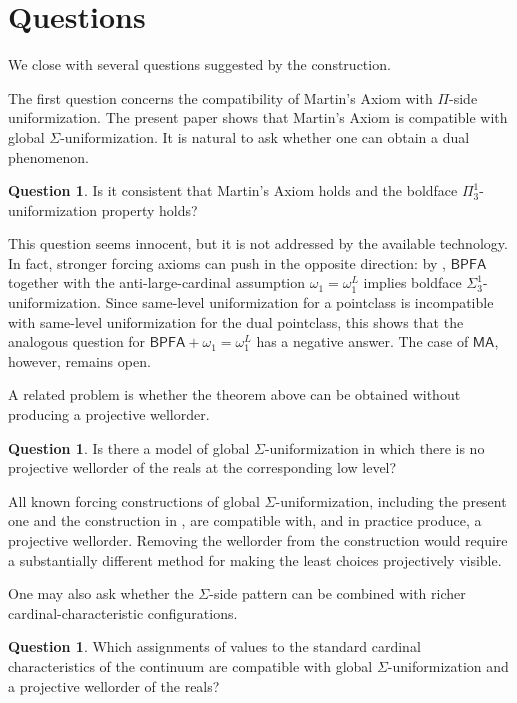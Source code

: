 \documentclass[11pt]{article}
\theoremstyle{plain}
\theoremstyle{definition}
\newtheorem{question}[theorem]{Question}
\theoremstyle{remark}
\newcommand{\MA}{\mathsf{MA}}
\newcommand{\BPFA}{\mathsf{BPFA}}
\begin{document}
\section{Questions}\label{sec:questions}

We close with several questions suggested by the construction.

The first question concerns the compatibility of Martin's Axiom with
\(\Pi\)-side uniformization.  The present paper shows that Martin's Axiom is
compatible with global \(\Sigma\)-uniformization.  It is natural to ask whether
one can obtain a dual phenomenon.

\begin{question}
Is it consistent that Martin's Axiom holds and the boldface
\(\Pi^1_3\)-uniformization property holds?
\end{question}

This question seems innocent, but it is not addressed by the available
technology.  In fact, stronger forcing axioms can push in the opposite direction:
by \cite{HoffelnerForcingAxioms}, \(\BPFA\) together with the anti-large-cardinal
assumption \(\omega_1=\omega_1^L\) implies boldface
\(\Sigma^1_3\)-uniformization.  Since same-level uniformization for a pointclass
is incompatible with same-level uniformization for the dual pointclass, this
shows that the analogous question for \(\BPFA+\omega_1=\omega_1^L\) has a
negative answer.  The case of \(\MA\), however, remains open.

A related problem is whether the theorem above can be obtained without producing
a projective wellorder.

\begin{question}
Is there a model of global \(\Sigma\)-uniformization in which there is no
projective wellorder of the reals at the corresponding low level?
\end{question}

All known forcing constructions of global \(\Sigma\)-uniformization, including
the present one and the construction in
\cite{BPFA_and_global_Sigma-uniformization}, are compatible with, and in practice
produce, a projective wellorder.  Removing the wellorder from the construction
would require a substantially different method for making the least choices
projectively visible.


One may also ask whether the \(\Sigma\)-side pattern can be combined with richer
cardinal-characteristic configurations.

\begin{question}
Which assignments of values to the standard cardinal characteristics of the
continuum are compatible with global \(\Sigma\)-uniformization and a projective
wellorder of the reals?
\end{question}
\end{document}
